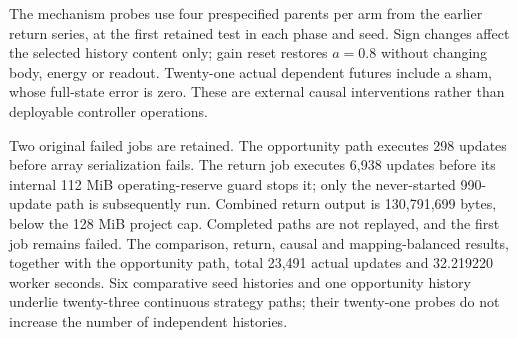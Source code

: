 The mechanism probes use four prespecified parents per arm from the earlier return series, at the first retained test in each phase and seed. Sign changes affect the selected history content only; gain reset restores $a=0.8$ without changing body, energy or readout. Twenty-one actual dependent futures include a sham, whose full-state error is zero. These are external causal interventions rather than deployable controller operations.

Two original failed jobs are retained. The opportunity path executes 298 updates before array serialization fails. The return job executes 6,938 updates before its internal 112 MiB operating-reserve guard stops it; only the never-started 990-update path is subsequently run. Combined return output is 130,791,699 bytes, below the 128 MiB project cap. Completed paths are not replayed, and the first job remains failed. The comparison, return, causal and mapping-balanced results, together with the opportunity path, total 23,491 actual updates and 32.219220 worker seconds. Six comparative seed histories and one opportunity history underlie twenty-three continuous strategy paths; their twenty-one probes do not increase the number of independent histories.

